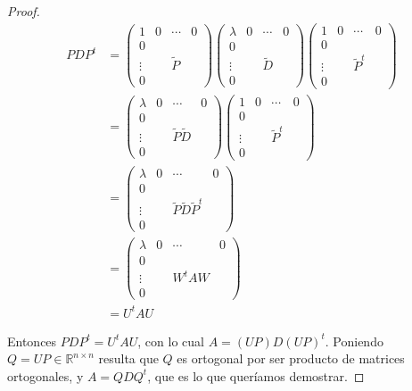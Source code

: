 \begin{propo}
\begin{proof}
\begin{align*}
PDP^t &= \left(\begin{array}{c|ccc}
1 & 0 & \cdots & 0\\ \hline
0 & & & \\
\vdots & & \tilde{P} &\\
0 & & &
\end{array}\right)
\left(\begin{array}{c|ccc}
\lambda & 0 & \cdots & 0 \\ \hline
0 & & & \\
\vdots & & \tilde{D} &\\
0 & & &
\end{array}\right)
\left(\begin{array}{c|ccc}
1 & 0 & \cdots & 0\\ \hline
0 & & & \\
\vdots & & \tilde{P}^t &\\
0 & & &
\end{array}\right)\\
&= \left(\begin{array}{c|ccc}
\lambda & 0 & \cdots & 0\\ \hline
0 & & & \\
\vdots & & \tilde{P}\tilde{D} &\\
0 & & &
\end{array}\right)
\left(\begin{array}{c|ccc}
1 & 0 & \cdots & 0\\ \hline
0 & & & \\
\vdots & & \tilde{P}^t &\\
0 & & &
\end{array}\right)\\
& = \left(\begin{array}{c|ccc}
\lambda & 0 & \cdots & 0\\ \hline
0 & & & \\
\vdots & & \tilde{P}\tilde{D}\tilde{P}^t &\\
0 & & &
\end{array}\right)\\
& = \left(\begin{array}{c|ccc}
\lambda & 0 & \cdots & 0\\ \hline
0 & & & \\
\vdots & & W^tAW &\\
0 & & &
\end{array}\right)\\
& = U^tAU
\end{align*}

Entonces $PDP^t = U^tAU$, con lo cual $A = (UP)D(UP)^t$. Poniendo $Q = UP \in \mathbb{R}^{n \times n}$ resulta que $Q$ es ortogonal por ser producto de matrices ortogonales, y $A = QDQ^t$, que es lo que queríamos demostrar.
\end{proof}
\end{propo}

